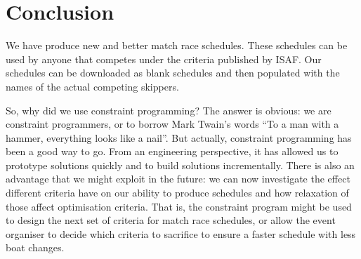 \documentclass{llncs}
\begin{document}
\section{Conclusion}\label{sec:conclusions}

We have produce new and better match race schedules. These schedules can be used by anyone that
competes under the criteria published by ISAF. Our schedules can be downloaded as blank schedules
and then populated with the names of the actual competing skippers.

So, why did we use constraint programming? The answer is obvious:  we are constraint programmers, or
to borrow Mark Twain's words ``To a man with a hammer, everything looks like a nail''. But actually,
constraint programming has been a good way to go. From an engineering perspective, it has allowed us
to prototype solutions quickly and to build solutions incrementally. There is also an advantage that
we might exploit in the future: we can now investigate the effect different criteria have on our
ability to produce schedules and how relaxation of those affect optimisation criteria. That is, the
constraint program might be used to design the next set of criteria for match race schedules, or
allow the event organiser to decide which criteria to sacrifice to ensure a faster schedule with
less boat changes.



\end{document}
